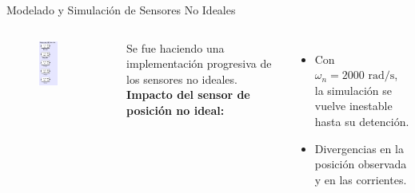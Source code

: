 \documentclass[12pt]{beamer}
\begin{document}
\begin{frame}{Modelado y Simulación de Sensores No Ideales}
    \begin{columns}
        \begin{figure}
            \centering
            \includegraphics[width=0.5\textwidth]{Imagenes/sensores_no_ideales.png}
        \end{figure}

        Se fue haciendo una implementación progresiva de los sensores no ideales.
        \textbf{Impacto del sensor de posición no ideal:}
        \begin{itemize}
            \item Con \(\omega_n = 2000 \text{ rad/s}\), la simulación se vuelve inestable hasta su detención.
            \item Divergencias en la posición observada y en las corrientes.
        \end{itemize}
    \end{columns}
\end{frame}
\end{document}
